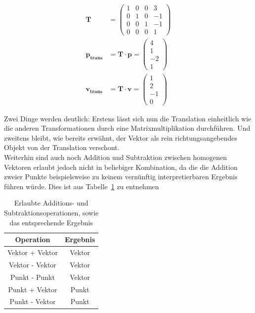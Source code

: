 \begin{align*}
    \mathbf{T}& = \begin{pmatrix}
        1 & 0 & 0 & 3\\
        0 & 1 & 0 & -1\\
        0 & 0 & 1 & -1\\
        0 & 0 & 0 & 1
    \end{pmatrix}\\
    \mathbf{p_{trans}}& = \mathbf{T} \cdot \mathbf{p} = \begin{pmatrix} 4 \\ 1 \\ -2 \\ 1  \end{pmatrix}\\
    \mathbf{v_{trans}}& = \mathbf{T} \cdot \mathbf{v} = \begin{pmatrix} 1 \\ 2 \\ -1 \\ 0  \end{pmatrix}
\end{align*}

Zwei Dinge werden deutlich: Erstens lässt sich nun die Translation einheitlich wie die anderen Transformationen
durch eine Matrixmultiplikation durchführen. Und zweitens bleibt, wie bereits erwähnt, der Vektor als rein 
richtungsangebendes Objekt von der Translation verschont.\\


Weiterhin sind auch noch Addition und Subtraktion zwischen homogenen Vektoren erlaubt jedoch nicht in beliebiger
Kombination, da die die Addition zweier Punkte beispielsweise zu keinem vernünftig interpretierbaren Ergebnis führen würde. Dies ist aus Tabelle~\ref{tab_Operationen} zu entnehmen

\begin{table}[ht]
\centering
\begin{tabular}{|c c|}
\hline 
Operation & Ergebnis \\ 
\hline 
Vektor + Vektor  & Vektor \\ 
\hline 
Vektor - Vektor & Vektor \\ 
\hline 
Punkt - Punkt & Vektor \\ 
\hline 
Punkt + Vektor & Punkt \\ 
\hline 
Punkt - Vektor & Punkt \\ 
\hline 
\end{tabular} 
\caption{Erlaubte Additions- und Subtraktionsoperationen, sowie das entsprechende Ergebnis}
    \label{tab_Operationen}
\end{table}